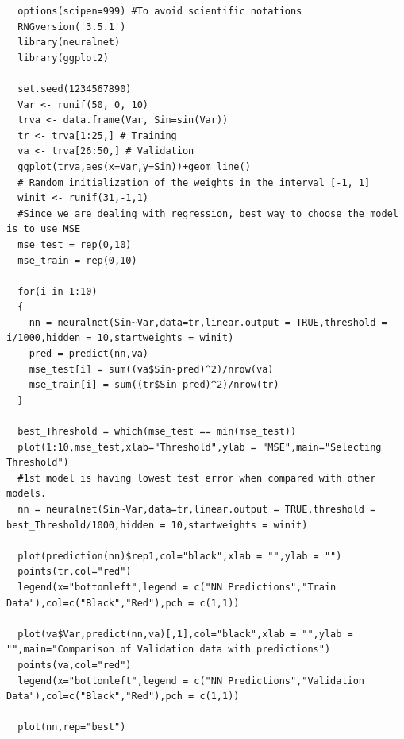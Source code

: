 \documentclass[a4paper,10pt]{article}
\begin{document}
\begin{lstlisting}
  options(scipen=999) #To avoid scientific notations
  RNGversion('3.5.1')
  library(neuralnet)
  library(ggplot2)
  
  set.seed(1234567890)
  Var <- runif(50, 0, 10)
  trva <- data.frame(Var, Sin=sin(Var))
  tr <- trva[1:25,] # Training
  va <- trva[26:50,] # Validation
  ggplot(trva,aes(x=Var,y=Sin))+geom_line()
  # Random initialization of the weights in the interval [-1, 1]
  winit <- runif(31,-1,1)
  #Since we are dealing with regression, best way to choose the model is to use MSE
  mse_test = rep(0,10)
  mse_train = rep(0,10)
  
  for(i in 1:10)
  {
    nn = neuralnet(Sin~Var,data=tr,linear.output = TRUE,threshold = i/1000,hidden = 10,startweights = winit)
    pred = predict(nn,va)
    mse_test[i] = sum((va$Sin-pred)^2)/nrow(va)
    mse_train[i] = sum((tr$Sin-pred)^2)/nrow(tr)
  }
  
  best_Threshold = which(mse_test == min(mse_test))
  plot(1:10,mse_test,xlab="Threshold",ylab = "MSE",main="Selecting Threshold")
  #1st model is having lowest test error when compared with other models.
  nn = neuralnet(Sin~Var,data=tr,linear.output = TRUE,threshold = best_Threshold/1000,hidden = 10,startweights = winit)
  
  plot(prediction(nn)$rep1,col="black",xlab = "",ylab = "")
  points(tr,col="red")
  legend(x="bottomleft",legend = c("NN Predictions","Train Data"),col=c("Black","Red"),pch = c(1,1))
  
  plot(va$Var,predict(nn,va)[,1],col="black",xlab = "",ylab = "",main="Comparison of Validation data with predictions")
  points(va,col="red")
  legend(x="bottomleft",legend = c("NN Predictions","Validation Data"),col=c("Black","Red"),pch = c(1,1))
  
  plot(nn,rep="best")  
\end{lstlisting}
\end{document}
